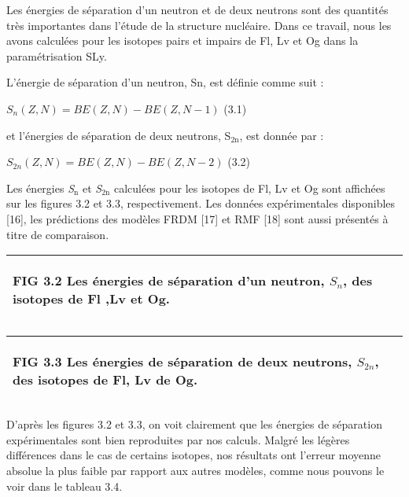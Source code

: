 \documentclass[a4paper]{article}
\providecommand\textsubscript[1]{\ensuremath{{}_{\text{#1}}}}
\begin{document}
 Les énergies de séparation d’un neutron et de deux neutrons sont des quantités très importantes dans l’étude de la structure nucléaire. Dans ce travail, nous les avons calculées pour les isotopes pairs et impairs de Fl, Lv et Og dans la paramétrisation SLy.

L’énergie de séparation d’un neutron, Sn, est définie comme suit :

  $S_n\left(Z,N\right)=\mathit{BE}\left(Z,N\right)-\mathit{BE}(Z,N-1)$ (3.1)

et l’énergies de séparation de deux neutrons, S\textsubscript{2n}, est donnée par :

  $S_{2n}\left(Z,N\right)=\mathit{BE}\left(Z,N\right)-\mathit{BE}(Z,N-2)$ (3.2)

Les énergies \textit{S}\textit{\textsubscript{n}}\textit{ }et \textit{S}\textit{\textsubscript{2n}} calculées pour les isotopes de Fl, Lv et  Og sont affichées sur les figures 3.2 et 3.3, respectivement. Les données expérimentales disponibles [16], les prédictions des modèles FRDM [17] et RMF [18] sont aussi présentés à titre de comparaison.

\begin{flushleft}
\tablefirsthead{}
\tablehead{}
\tabletail{}
\tablelasttail{}
\begin{supertabular}{|m{6.31846in}|}
\hline
{\begin{french}  FIG 3.2 Les énergies de séparation d’un neutron,  $S_n$, des isotopes de Fl ,Lv et Og.\end{french}}\\\hline
\end{supertabular}
\end{flushleft}
\begin{flushleft}
\tablefirsthead{}
\tablehead{}
\tabletail{}
\tablelasttail{}
\begin{supertabular}{|m{6.31846in}|}
\hline
{\begin{french} FIG 3.3 Les énergies de séparation de deux neutrons,  $S_{2n}$, des isotopes de Fl, Lv de Og.\end{french}}\\\hline
\end{supertabular}
\end{flushleft}
 D’après les figures 3.2 et 3.3, on voit clairement que les énergies de séparation expérimentales sont bien reproduites par nos calculs. Malgré les légères différences dans le cas de certains isotopes, nos résultats ont l’erreur moyenne absolue la plus faible par rapport aux autres modèles, comme nous pouvons le voir dans le tableau 3.4.
\end{document}
